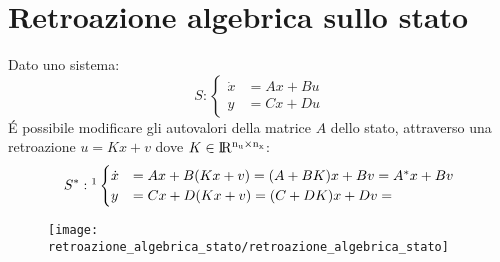 \documentclass[../main.tex]{subfiles}
\begin{document}
	\section{Retroazione algebrica sullo stato}
		Dato uno sistema:
		\[
			S: 
			\begin{cases}
				\dot x &= Ax + Bu\\
				y &= Cx + Du
			\end{cases}
		\]
		\'E possibile modificare gli autovalori della matrice $ A $ dello stato, attraverso una retroazione $ u = Kx + v $ dove $ K \in \rm I\!R^{n_u \times n_x} $:
		\[
			S^{*}: \footnotemark
			\begin{cases}
				\dot x &= Ax + B(Kx+v) = (A+BK)x + Bv = A^{*}x + Bv\\
				y &= Cx +D(Kx+v) = (C+DK)x + Dv = 
			\end{cases}
		\]
		
		\begin{figure}[h!]
			\centering\texttt{[image: retroazione\_algebrica\_stato/retroazione\_algebrica\_stato]}
		\end{figure}
		
\end{document}
